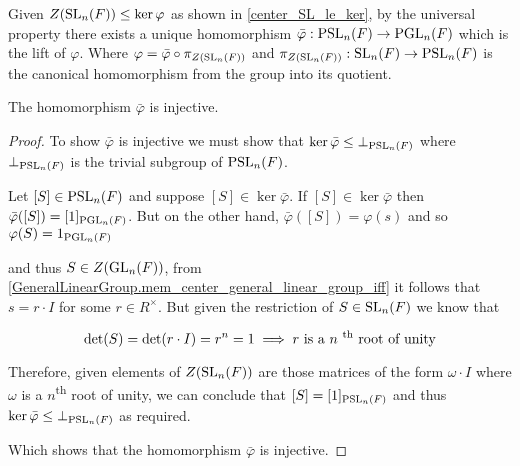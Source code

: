 \begin{definition}
\label{PSL_monoidHom_PGL}
\leanok
    Given $Z(\operatorname{SL}_n(F)) \leq \ker \varphi$ as shown in \ref{center_SL_le_ker}, by the universal property there exists a unique homomorphism $\bar{\varphi} : \operatorname{PSL}_n(F) \rightarrow \operatorname{PGL}_n(F)$ which is the lift of $\varphi$. 
    Where $\varphi = \bar{\varphi} \circ \pi_{Z(\operatorname{SL}_n(F))}$ and $\pi_{Z(\operatorname{SL}_n(F))} : \operatorname{SL}_n(F) \rightarrow \operatorname{PSL}_n(F)$ is the canonical homomorphism from the group into its quotient.
\end{definition}



\begin{lemma}
\label{Injective_PSL_monoidHom_PGL}
\leanok
    The homomorphism $\bar{\varphi}$ is injective.
\end{lemma}

\begin{proof}
\leanok

To show $\bar{\varphi}$ is injective we must show that $\ker \bar{\varphi} \leq \bot_{\operatorname{PSL}_n(F)}$ where $\bot_{\operatorname{PSL}_n(F)}$ is the trivial subgroup of $\operatorname{PSL}_n(F)$.

Let $[S] \in \operatorname{PSL}_n(F)$ and suppose $[S] \in \ker \bar{\varphi}$. If $[S] \in \ker \bar{\varphi}$ then $\bar{\varphi} ([S]) = [1]_{\operatorname{PGL}_n(F)}$. But on the other hand, $\bar{\varphi} ([S]) = \varphi(s)$ and so $\varphi(S) = 1_{\operatorname{PGL}_n(F)}$

and thus $S \in Z(\operatorname{GL}_n(F))$, from \ref{GeneralLinearGroup.mem_center_general_linear_group_iff} it follows that $s = r \cdot I$ for some $r \in R^\times$. But given the restriction of $S \in \operatorname{SL}_n(F)$ we know that 

\begin{equation*}
    \det(S) = \det(r \cdot I) = r^n = 1 \implies \text{$r$ is a $n$ \textsuperscript{th} root of unity}
\end{equation*}

Therefore, given elements of $Z(\operatorname{SL}_n(F))$ are those matrices of the form $\omega \cdot I$ where $\omega$ is a $n$\textsuperscript{th} root of unity, we can conclude that $[S] = [1]_{\operatorname{PSL}_n(F)}$ and thus $\ker \bar{\varphi} \leq \bot_{\operatorname{PSL}_n(F)}$ as required.

Which shows that the homomorphism $\bar{\varphi}$ is injective.
\end{proof}

